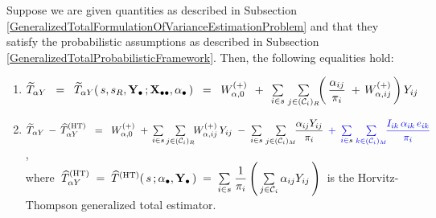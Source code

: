 \begin{lemma}
\label{GeneralizedTotalImputationError}
\mbox{}
\vskip 0.1cm
\noindent
Suppose we are given quantities as described in Subsection
\ref{GeneralizedTotalFormulationOfVarianceEstimationProblem}
and
that they satisfy the probabilistic assumptions as described in Subsection
\ref{GeneralizedTotalProbabilisticFramework}.
\vskip 0.1cm
\noindent
Then, the following equalities hold:
\renewcommand{\theenumi}{\roman{enumi}}
\renewcommand{\labelenumi}{\mbox{}\;\;\,(\theenumi)$\quad$}
\begin{enumerate}
\item
    $
    \widetilde{T}_{\alpha Y}
    \;\; = \;\;
        \widetilde{T}_{\alpha Y}(\,s,s_{R},\mathbf{Y}_{\bullet}\,;\mathbf{X}_{\bullet\bullet},\alpha_{\bullet}\,)
    \;\; = \;\;
        W^{(+)}_{\alpha,0}
        \;\, + \;\,
        \underset{i \in {\color{black}s}}{\sum}\;
        \underset{j \in (\mathcal{C}_{i})_{R}}{\sum}\!\!
        \left(\,
            \dfrac{
                \alpha_{ij}
                }{
                \pi_{i}
                }
            \; + \,
            W^{(+)}_{\alpha,ij}
            \,\right)
        Y_{ij}
    $
\item
    $
    \widetilde{T}_{\alpha Y}
    \, - \,
    \widehat{T}^{\textnormal{(HT)}}_{\alpha Y}
    \;\; = \;\;
        W^{(+)}_{\alpha,0}
        \; + \,
        \underset{i \in {\color{black}s}}{\sum}\,
        \underset{j \in (\mathcal{C}_{i})_{R}}{\sum}\!
        W^{(+)}_{\alpha,ij}\,Y_{ij}
        \; - \;
        \underset{i \in {\color{black}s}}{\sum}\;
        \underset{j \in (\mathcal{C}_{i})_{M}}{\sum}\!
        \dfrac{ \alpha_{ij}Y_{ij} }{ \pi_{i} }
        {\color{blue}
        \;\, + \;\,
        \underset{i \in {\color{black}s}}{\sum}\;
        \underset{k \in (\mathcal{C}_{i})_{M}}{\sum}\!
        \dfrac{I_{ik}\,\alpha_{ik}\,e_{ik}}{\pi_{i}}
        }
    $,\\
    where
    \,$
    \widehat{T}^{\textnormal{(HT)}}_{\alpha Y}
    \; = \;
    \widehat{T}^{\textnormal{(HT)}}(\,s\,;\alpha_{\bullet},\mathbf{Y}_{\bullet}\,)
    \; = \;
        \underset{i \in s}{\sum}\;
        \dfrac{1}{\pi_{i}}
        \left(\,
            \underset{j \in \mathcal{C}_{i}}{\sum}\,\alpha_{ij}Y_{ij}
            \,\right)
    $\,
    is the Horvitz-Thompson generalized total estimator.
\end{enumerate}
\end{lemma}
\proof
